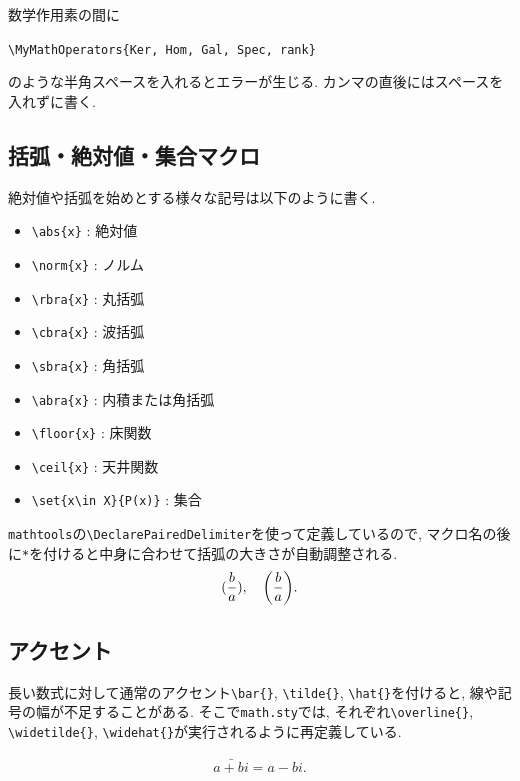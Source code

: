 \documentclass[../main.tex]{subfiles}
\begin{document}
\begin{rem}{}{}
	数学作用素の間に
	\begin{center}
		\verb|\MyMathOperators{Ker, Hom, Gal, Spec, rank}|
	\end{center}
	のような半角スペースを入れるとエラーが生じる. 
	カンマの直後にはスペースを入れずに書く. 
\end{rem}

\subsection{括弧・絶対値・集合マクロ}

絶対値や括弧を始めとする様々な記号は以下のように書く.

\begin{itemize}
	\item \verb|\abs{x}| : 絶対値
	\item \verb|\norm{x}| : ノルム
	\item \verb|\rbra{x}| : 丸括弧
	\item \verb|\cbra{x}| : 波括弧
	\item \verb|\sbra{x}| : 角括弧
	\item \verb|\abra{x}| : 内積または角括弧
	\item \verb|\floor{x}| : 床関数
	\item \verb|\ceil{x}| : 天井関数
	\item \verb|\set{x\in X}{P(x)}| : 集合
\end{itemize}

\begin{rem}{}{}
	\texttt{mathtools}の\verb|\DeclarePairedDelimiter|を使って定義しているので, マクロ名の後に\texttt{*}を付けると中身に合わせて括弧の大きさが自動調整される. 
	\begin{align}
		\rbra{\frac{b}{a}}, \quad \rbra*{\frac{b}{a}}.
	\end{align}
\end{rem}

\subsection{アクセント}

長い数式に対して通常のアクセント\verb|\bar{}|, \verb|\tilde{}|, \verb|\hat{}|を付けると, 線や記号の幅が不足することがある. 
そこで\texttt{math.sty}では, それぞれ\verb|\overline{}|, \verb|\widetilde{}|, \verb|\widehat{}|が実行されるように再定義している. 

\begin{ex}{}{}
	\begin{align}
		\bar{a+bi}=a-bi.
	\end{align}
\end{ex}
\end{document}
